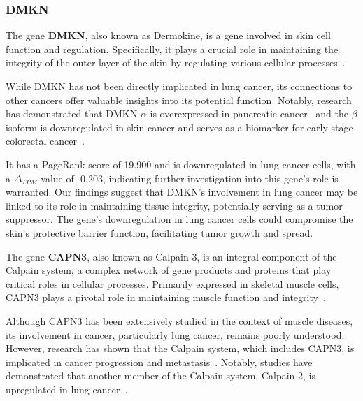 \subsubsection*{DMKN} \label{subsubsec:dmkn}
The gene \textbf{DMKN}, also known as Dermokine, is a gene involved in skin cell function and regulation.
Specifically, it plays a crucial role in maintaining the integrity of the outer layer of the skin
by regulating various cellular processes~\cite{Naso2007Deromokine}.

While DMKN has not been directly implicated in lung cancer, its connections to other cancers offer valuable insights into its potential function.
Notably, research has demonstrated that DMKN-$\alpha$ is overexpressed in pancreatic cancer~\cite{Zhang2022DMKN}
and the $\beta$ isoform is downregulated in skin cancer and serves as a biomarker for early-stage colorectal cancer~\cite{Hasegawa2012Dermokine}.

It has a PageRank score of 19.900 and is downregulated in lung cancer cells,
with a $\Delta_{TPM}$ value of -0.203, indicating further investigation into this gene's role is warranted.
Our findings suggest that DMKN's involvement in lung cancer may be linked to its role in maintaining tissue integrity,
potentially serving as a tumor suppressor.
The gene's downregulation in lung cancer cells could compromise the skin's protective barrier function, facilitating tumor growth and spread.
\newline

The gene \textbf{CAPN3}, also known as Calpain 3, is an integral component of the Calpain system,
a complex network of gene products and proteins that play critical roles in cellular processes.
Primarily expressed in skeletal muscle cells, CAPN3 plays a pivotal role in maintaining muscle function and integrity~\cite{Spinozzi2021Calpain}.

Although CAPN3 has been extensively studied in the context of muscle diseases,
its involvement in cancer, particularly lung cancer, remains poorly understood.
However, research has shown that the Calpain system, which includes CAPN3, is implicated in cancer progression and metastasis~\cite{Storr2011Calpain}.
Notably, studies have demonstrated that another member of the Calpain system, Calpain 2, is upregulated in lung cancer~\cite{Xu2019Calpain}.

